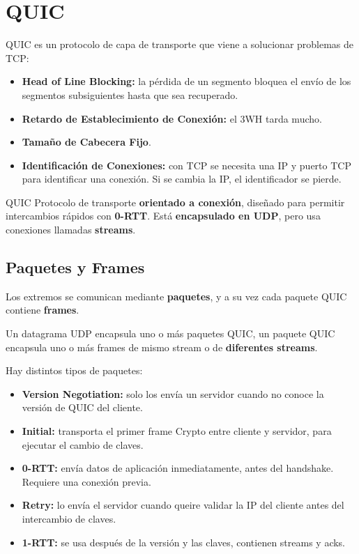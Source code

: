 \section{QUIC}

QUIC es un protocolo de capa de transporte que viene a solucionar problemas de TCP:

\begin{itemize}[label=\textcolor{acento}{$\bullet$}]
    \item \textbf{Head of Line Blocking:} la pérdida de un segmento bloquea el envío de los segmentos subsiguientes hasta que sea recuperado. 
    \item \textbf{Retardo de Establecimiento de Conexión:} el 3WH tarda mucho. 
    \item \textbf{Tamaño de Cabecera Fijo}. 
    \item \textbf{Identificación de Conexiones:} con TCP se necesita una IP y puerto TCP para identificar una conexión. Si se cambia la IP, el identificador se pierde. 
\end{itemize}

\begin{definicion}{QUIC}
    Protocolo de transporte \textbf{orientado a conexión}, diseñado para permitir intercambios rápidos con \textbf{0-RTT}. Está \textbf{encapsulado en UDP}, pero usa conexiones llamadas \textbf{streams}.
\end{definicion}

\subsection{Paquetes y Frames}

Los extremos se comunican mediante \textbf{paquetes}, y a su vez cada paquete QUIC contiene \textbf{frames}. 

Un datagrama UDP encapsula uno o más paquetes QUIC, un paquete QUIC encapsula uno o más frames de mismo stream o de \textbf{diferentes streams}. 

Hay distintos tipos de paquetes:

\begin{itemize}[label=\textcolor{acento}{$\bullet$}]
    \item \textbf{Version Negotiation:} solo los envía un servidor cuando no conoce la versión de QUIC del cliente.
    \item \textbf{Initial:} transporta el primer frame Crypto entre cliente y servidor, para ejecutar el cambio de claves.
    \item \textbf{0-RTT:} envía datos de aplicación inmediatamente, antes del handshake. Requiere una conexión previa.
    \item \textbf{Retry:} lo envía el servidor cuando queire validar la IP del cliente antes del intercambio de claves.
    \item \textbf{1-RTT:} se usa después de la versión y las claves, contienen streams y acks.
\end{itemize}

